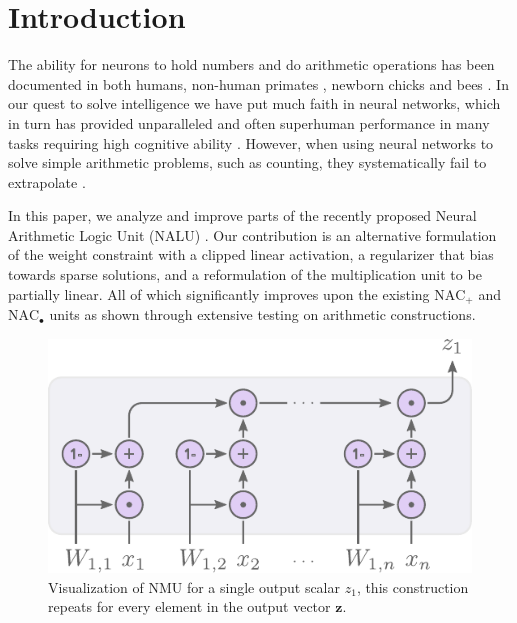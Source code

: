 \section{Introduction}

The ability for neurons to hold numbers and do arithmetic operations has been documented in both humans, non-human primates \cite{nieder-neuronal-number}, newborn chicks \cite{rugani-arithmetic-chicks} and bees \cite{gallistel-numbers-in-brain}.
In our quest to solve intelligence we have put much faith in neural networks, which in turn has provided unparalleled and often superhuman performance in many tasks requiring high cognitive ability \cite{natureGo,googleNMT,resnet}.
However, when using neural networks to solve simple arithmetic problems, such as counting, they systematically fail to extrapolate \cite{stillNotSystematic,suzgun2019evaluating,trask-nalu}. 

In this paper, we analyze and improve parts of the recently proposed Neural Arithmetic Logic Unit (NALU) \cite{trask-nalu}. Our contribution is an alternative formulation of the weight constraint with a clipped linear activation, a regularizer that bias towards sparse solutions, and a reformulation of the multiplication unit to be partially linear. All of which significantly improves upon the existing $\text{NAC}_{+}$ and $\text{NAC}_{\bullet}$ units as shown through extensive testing on arithmetic constructions.%

\begin{figure}[h]
\centering
\includegraphics[scale=0.8]{graphics/nmu.pdf}
\caption{Visualization of NMU for a single output scalar $z_1$, this construction repeats for every element in the output vector $\mathbf{z}$.}
\end{figure}

